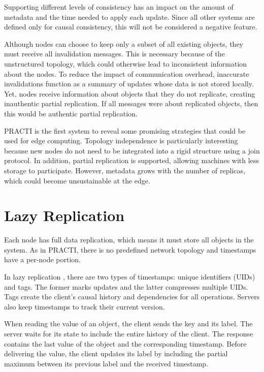 Supporting different levels of consistency has an impact on the amount of metadata and the time needed to apply each update. Since all other systems are defined only for causal consistency, this will not be considered a negative feature. 

Although nodes can choose to keep only a subset of all existing objects, they must receive all invalidation messages. This is necessary because of the unstructured topology, which could otherwise lead to inconsistent information about the nodes. To reduce the impact of communication overhead, inaccurate invalidations function as a summary of updates whose data is not stored locally. Yet, nodes receive information about objects that they do not replicate, creating inauthentic partial replication. If all messages were about replicated objects, then this would be authentic partial replication. 

PRACTI is the first system to reveal some promising strategies that could be used for edge computing. Topology independence is particularly interesting because new nodes do not need to be integrated into a rigid structure using a join protocol. In addition, partial replication is supported, allowing machines with less storage to participate. However, metadata grows with the number of replicas, which could become unsustainable at the edge.

\section{Lazy Replication}
\label{sec:soa:lazy-replication}

Each node has full data replication, which means it must store all objects in the system. As in PRACTI, there is no predefined network topology and timestamps have a per-node portion. 

In lazy replication \cite{ladin1992providing}, there are two types of timestamps: unique identifiers (UIDs) and tags. The former marks updates and the latter compresses multiple UIDs. Tags create the client's causal history and dependencies for all operations. Servers also keep timestamps to track their current version. 

When reading the value of an object, the client sends the key and its label. The server waits for its state to include the entire history of the client. The response contains the last value of the object and the corresponding timestamp. Before delivering the value, the client updates its label by including the partial maximum between its previous label and the received timestamp. 

